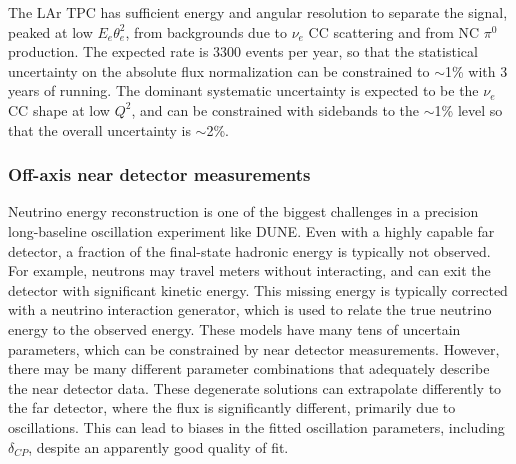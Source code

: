 The LAr TPC has sufficient energy and angular resolution to separate the signal, peaked at low $E_{e}\theta_{e}^{2}$, from backgrounds due to $\nu_{e}$ CC scattering and from NC $\pi^{0}$ production. The expected rate is 3300 events per year, so that the statistical uncertainty on the absolute flux normalization can be constrained to $\sim$1\% with 3 years of running. The dominant systematic uncertainty is expected to be the $\nu_{e}$ CC shape at low $Q^{2}$, and can be constrained with sidebands to the $\sim$1\% level so that the overall uncertainty is $\sim$2\%.

\subsubsection{Off-axis near detector measurements}
\label{sec:ch-nu-osc-06-ndconcept-offaxis}

Neutrino energy reconstruction is one of the biggest challenges in a precision long-baseline oscillation experiment like DUNE. Even with a highly capable far detector, a fraction of the final-state hadronic energy is typically not observed. For example, neutrons may travel meters without interacting, and can exit the detector with significant kinetic energy. This missing energy is typically corrected with a neutrino interaction generator, which is used to relate the true neutrino energy to the observed energy. These models have many tens of uncertain parameters, which can be constrained by near detector measurements. However, there may be many different parameter combinations that adequately describe the near detector data. These degenerate solutions can extrapolate differently to the far detector, where the flux is significantly different, primarily due to oscillations. This can lead to biases in the fitted oscillation parameters, including $\delta_{CP}$, despite an apparently good quality of fit.

